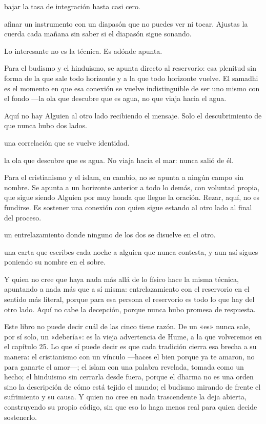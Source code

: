 \begin{fisica}
 bajar la tasa de integración hasta casi cero.

 afinar un instrumento con un diapasón que no puedes ver ni tocar. Ajustas la cuerda cada mañana sin saber si el diapasón sigue sonando.
\end{fisica}
Lo interesante no es la técnica. Es adónde apunta.

\noindent Para el budismo y el hinduismo, se apunta directo al reservorio: esa plenitud sin forma de la que sale todo horizonte y a la que todo horizonte vuelve. El samadhi es el momento en que esa conexión se vuelve indistinguible de ser uno mismo con el fondo —la ola que descubre que es agua, no que viaja hacia el agua.

Aquí no hay Alguien al otro lado recibiendo el mensaje. Solo el descubrimiento de que nunca hubo dos lados.

\begin{fisica}
 una correlación que se vuelve identidad.

 la ola que descubre que es agua. No viaja hacia el mar: nunca salió de él.
\end{fisica}
\noindent Para el cristianismo y el islam, en cambio, no se apunta a ningún campo sin nombre. Se apunta a un horizonte anterior a todo lo demás, con voluntad propia, que sigue siendo Alguien por muy honda que llegue la oración. Rezar, aquí, no es fundirse. Es sostener una conexión con quien sigue estando al otro lado al final del proceso.

\begin{fisica}
 un entrelazamiento donde ninguno de los dos se disuelve en el otro.

 una carta que escribes cada noche a alguien que nunca contesta, y aun así sigues poniendo su nombre en el sobre.
\end{fisica}
Y quien no cree que haya nada más allá de lo físico hace la misma técnica, apuntando a nada más que a sí misma: entrelazamiento con el reservorio en el sentido más literal, porque para esa persona el reservorio es todo lo que hay del otro lado. Aquí no cabe la decepción, porque nunca hubo promesa de respuesta.

\noindent Este libro no puede decir cuál de las cinco tiene razón. De un «es» nunca sale, por sí solo, un «debería»: es la vieja advertencia de Hume, a la que volveremos en el capítulo 25. Lo que sí puede decir es que cada tradición cierra esa brecha a su manera: el cristianismo con un vínculo —haces el bien porque ya te amaron, no para ganarte el amor—; el islam con una palabra revelada, tomada como un hecho; el hinduismo sin cerrarla desde fuera, porque el dharma no es una orden sino la descripción de cómo está tejido el mundo; el budismo mirando de frente el sufrimiento y su causa. Y quien no cree en nada trascendente la deja abierta, construyendo su propio código, sin que eso lo haga menos real para quien decide sostenerlo.

